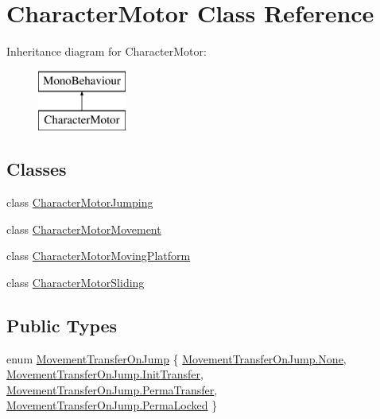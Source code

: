 \hypertarget{class_character_motor}{}\section{Character\+Motor Class Reference}
\label{class_character_motor}
Inheritance diagram for Character\+Motor\+:\begin{figure}[H]
\begin{center}
\leavevmode
\includegraphics[height=2.000000cm]{class_character_motor}
\end{center}
\end{figure}
\subsection*{Classes}
\begin{DoxyCompactItemize}
\item 
class \hyperlink{class_character_motor_1_1_character_motor_jumping}{Character\+Motor\+Jumping}
\item 
class \hyperlink{class_character_motor_1_1_character_motor_movement}{Character\+Motor\+Movement}
\item 
class \hyperlink{class_character_motor_1_1_character_motor_moving_platform}{Character\+Motor\+Moving\+Platform}
\item 
class \hyperlink{class_character_motor_1_1_character_motor_sliding}{Character\+Motor\+Sliding}
\end{DoxyCompactItemize}
\subsection*{Public Types}
\begin{DoxyCompactItemize}
\item 
enum \hyperlink{class_character_motor_ae8904b1ae7907502123f9376cf77a045}{Movement\+Transfer\+On\+Jump} \{ \hyperlink{class_character_motor_ae8904b1ae7907502123f9376cf77a045a6adf97f83acf6453d4a6a4b1070f3754}{Movement\+Transfer\+On\+Jump.\+None}, 
\hyperlink{class_character_motor_ae8904b1ae7907502123f9376cf77a045a58ffcf57c2b00a9e42d67e43391ca652}{Movement\+Transfer\+On\+Jump.\+Init\+Transfer}, 
\hyperlink{class_character_motor_ae8904b1ae7907502123f9376cf77a045a1caa5cdb42cd1fe12e5047b8aaa499b9}{Movement\+Transfer\+On\+Jump.\+Perma\+Transfer}, 
\hyperlink{class_character_motor_ae8904b1ae7907502123f9376cf77a045af922013cd8da7d5623b13b9b520bacc3}{Movement\+Transfer\+On\+Jump.\+Perma\+Locked}
 \}
\end{DoxyCompactItemize}
